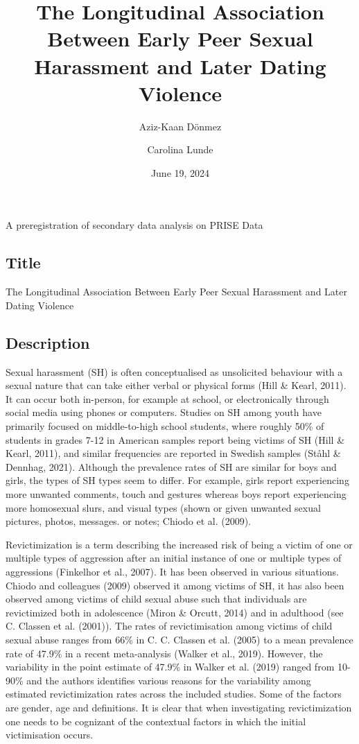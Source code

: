 \documentclass[
]{article}
\title{The Longitudinal Association Between Early Peer Sexual Harassment
and Later Dating Violence}
\author[1]{Aziz-Kaan Dönmez}
\author[1]{Carolina Lunde}
\affil[1]{University of Gothenburg}
\date{June 19, 2024}
\begin{document}
\maketitle

A preregistration of secondary data analysis on PRISE Data

\subsection{Title}\label{title}

The Longitudinal Association Between Early Peer Sexual Harassment and
Later Dating Violence

\subsection{Description}\label{description}

Sexual harassment (SH) is often conceptualised as unsolicited behaviour
with a sexual nature that can take either verbal or physical forms (Hill
\& Kearl, 2011). It can occur both in-person, for example at school, or
electronically through social media using phones or computers. Studies
on SH among youth have primarily focused on middle-to-high school
students, where roughly 50\% of students in grades 7-12 in American
samples report being victims of SH (Hill \& Kearl, 2011), and similar
frequencies are reported in Swedish samples (Ståhl \& Dennhag, 2021).
Although the prevalence rates of SH are similar for boys and girls, the
types of SH types seem to differ. For example, girls report experiencing
more unwanted comments, touch and gestures whereas boys report
experiencing more homosexual slurs, and visual types (shown or given
unwanted sexual pictures, photos, messages. or notes; Chiodo et al.
(2009).

Revictimization is a term describing the increased risk of being a
victim of one or multiple types of aggression after an initial instance
of one or multiple types of aggressions (Finkelhor et al., 2007). It has
been observed in various situations. Chiodo and colleagues (2009)
observed it among victims of SH, it has also been observed among victims
of child sexual abuse such that individuals are revictimized both in
adolescence (Miron \& Orcutt, 2014) and in adulthood (see C. Classen et
al. (2001)). The rates of revictimisation among victims of child sexual
abuse ranges from 66\% in C. C. Classen et al. (2005) to a mean
prevalence rate of 47.9\% in a recent meta-analysis (Walker et al.,
2019). However, the variability in the point estimate of 47.9\% in
Walker et al. (2019) ranged from 10-90\% and the authors identifies
various reasons for the variability among estimated revictimization
rates across the included studies. Some of the factors are gender, age
and definitions. It is clear that when investigating revictimization one
needs to be cognizant of the contextual factors in which the initial
victimisation occurs.
\end{document}
